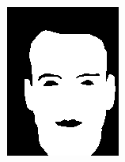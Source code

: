 \begin{figure}[h]
{\begin{subfigure}[b]{0.23\textwidth}
         \includegraphics[width=\textwidth]{images/results/cross/aa46_1.color.d3_ecu_sch_y.png}
     \end{subfigure}
    \hfill
     \begin{subfigure}[b]{0.23\textwidth}
         \centering

\end{subfigure}}
\end{figure}
